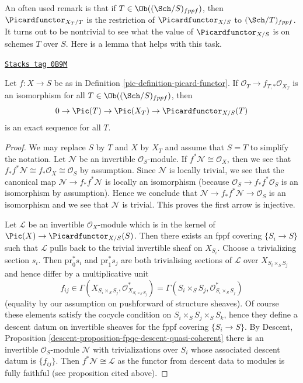 An often used remark is that if $T \in \Ob((\Sch/S)_{fppf})$, then
$\Picardfunctor_{X_T/T}$ is the restriction of $\Picardfunctor_{X/S}$ to
$(\Sch/T)_{fppf}$.
It turns out to be nontrivial to see what the value of $\Picardfunctor_{X/S}$
is on schemes $T$ over $S$. Here is a lemma that helps with this
task.

\begin{lemma}
\label{pic-lemma-flat-geometrically-connected-fibres}
\href{https://stacks.math.columbia.edu/tag/0B9M}{\texttt{Stacks tag 0B9M}}

Let $f : X \to S$ be as in Definition \ref{pic-definition-picard-functor}.
If $\mathcal{O}_T \to f_{T, *}\mathcal{O}_{X_T}$ is an isomorphism
for all $T \in \Ob((\Sch/S)_{fppf})$, then
$$
0 \to \Pic(T) \to \Pic(X_T) \to \Picardfunctor_{X/S}(T)
$$
is an exact sequence for all $T$.
\end{lemma}

\begin{proof}
We may replace $S$ by $T$ and $X$ by $X_T$ and assume that $S = T$
to simplify the notation. Let $\mathcal{N}$ be an invertible
$\mathcal{O}_S$-module. If $f^*\mathcal{N} \cong \mathcal{O}_X$, then
we see that $f_*f^*\mathcal{N} \cong f_*\mathcal{O}_X \cong \mathcal{O}_S$
by assumption. Since $\mathcal{N}$ is locally trivial, we see that
the canonical map $\mathcal{N} \to f_*f^*\mathcal{N}$ is locally
an isomorphism (because $\mathcal{O}_S \to f_*f^*\mathcal{O}_S$
is an isomorphism by assumption). Hence we conclude that
$\mathcal{N} \to f_*f^*\mathcal{N} \to \mathcal{O}_S$ is an isomorphism
and we see that $\mathcal{N}$ is trivial. This proves the first arrow
is injective.

\medskip\noindent
Let $\mathcal{L}$ be an invertible $\mathcal{O}_X$-module which is in
the kernel of $\Pic(X) \to \Picardfunctor_{X/S}(S)$. Then there exists
an fppf covering $\{S_i \to S\}$ such that $\mathcal{L}$ pulls back
to the trivial invertible sheaf on $X_{S_i}$. Choose a trivializing
section $s_i$. Then $\text{pr}_0^*s_i$ and $\text{pr}_1^*s_j$ are both
trivialising sections of $\mathcal{L}$ over $X_{S_i \times_S S_j}$
and hence differ by a multiplicative unit
$$
f_{ij} \in
\Gamma(X_{S_i \times_S S_j}, \mathcal{O}_{X_{S_i \times_S S_j}}^*) =
\Gamma(S_i \times_S S_j, \mathcal{O}_{S_i \times_S S_j}^*)
$$
(equality by our assumption on pushforward of structure sheaves).
Of course these elements satisfy the cocycle condition on
$S_i \times_S S_j \times_S S_k$, hence they define a descent datum
on invertible sheaves for the fppf covering $\{S_i \to S\}$.
By Descent, Proposition \ref{descent-proposition-fpqc-descent-quasi-coherent}
there is an invertible $\mathcal{O}_S$-module $\mathcal{N}$
with trivializations over $S_i$ whose associated descent datum is
$\{f_{ij}\}$. Then $f^*\mathcal{N} \cong \mathcal{L}$ as the
functor from descent data to modules is fully faithful (see proposition
cited above).
\end{proof}


